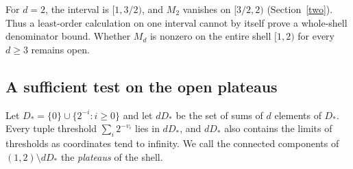 \documentclass[11pt]{article}
\begin{document}
For \(d=2\), the interval is \([1,3/2)\), and \(M_2\) vanishes on
\([3/2,2)\) (Section~\ref{two}). Thus a least-order calculation on one
interval cannot by itself prove a whole-shell denominator bound. Whether
\(M_d\) is nonzero on the entire shell \([1,2)\) for every \(d\ge3\)
remains open.

\subsection{A sufficient test on the open plateaus}
Let \(D_*=\{0\}\cup\{2^{-i}:i\ge0\}\) and let \(dD_*\) be the set of sums of
\(d\) elements of \(D_*\). Every tuple threshold \(\sum_i2^{-v_i}\) lies
in \(dD_*\), and \(dD_*\) also contains the limits of thresholds as
coordinates tend to infinity. We call the connected components of
\((1,2)\setminus dD_*\) the \emph{plateaus} of the shell.
\end{document}
